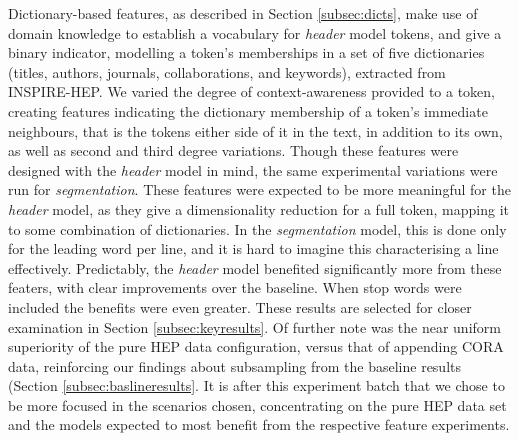 Dictionary-based features, as described in Section \ref{subsec:dicts}, make use of domain knowledge to establish a vocabulary for \emph{header} model tokens, and give a binary indicator, modelling a token's memberships in a set of five dictionaries (titles, authors, journals, collaborations, and keywords), extracted from INSPIRE-HEP. We varied the degree of context-awareness provided to a token, creating features indicating the dictionary membership of a token's immediate neighbours, that is the tokens either side of it in the text, in addition to its own, as well as second and third degree variations. Though these features were designed with the \emph{header} model in mind, the same experimental variations were run for \emph{segmentation}. These features were expected to be more meaningful for the \emph{header} model, as they give a dimensionality reduction for a full token, mapping it to some combination of dictionaries. In the \emph{segmentation} model, this is done only for the leading word per line, and it is hard to imagine this characterising a line effectively. Predictably, the \emph{header} model benefited significantly more from these featers, with clear improvements over the baseline. When stop words were included the benefits were even greater. These results are selected for closer examination in Section \ref{subsec:keyresults}. Of further note was the near uniform superiority of the pure HEP data configuration, versus that of appending CORA data, reinforcing our findings about subsampling from the baseline results (Section \ref{subsec:baslineresults}. It is after this experiment batch that we chose to be more focused in the scenarios chosen, concentrating on the pure HEP data set and the models expected to most benefit from the respective feature experiments.

